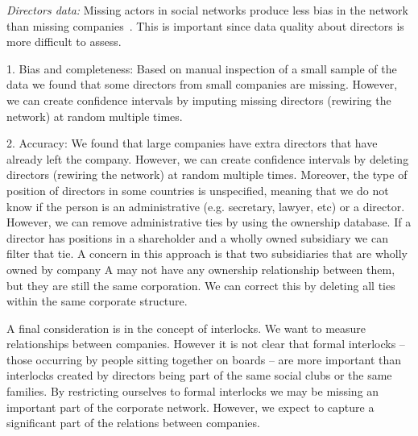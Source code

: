 \textit{Directors data: }
Missing actors in social networks produce less bias in the network than missing companies~\citep{Kossinets2006}.
This is important since data quality about directors is more difficult to assess.

1. Bias and completeness: 
Based on manual inspection of a small sample of the data we found that some directors from small companies are missing. 
However, we can create confidence intervals by imputing missing directors (rewiring the network) at random multiple times.

2.  Accuracy: 
We found that large companies have extra directors that have already left the company. 
However, we can create confidence intervals by deleting directors (rewiring the network) at random multiple times.
Moreover, the type of position of directors in some countries is unspecified, 
meaning that we do not know if the person is an administrative (e.g. secretary, lawyer, etc) or a director.
However, we can remove administrative ties by using the ownership database. 
If a director has positions in a shareholder and a wholly owned subsidiary we can filter that tie. 
A concern in this approach is that two subsidiaries that are wholly owned by company A may not have any ownership relationship between them, 
but they are still the same corporation. 
We can correct this by deleting all ties within the same corporate structure.


A final consideration is in the concept of interlocks. 
We want to measure relationships between companies. 
However it is not clear that formal interlocks -- those occurring by people sitting together on boards -- 
are more important than interlocks created by directors being part of the same social clubs or the same families. 
By restricting ourselves to formal interlocks we may be missing an important part of the corporate network. 
However, we expect to capture a significant part of the relations between companies.
\fi
 